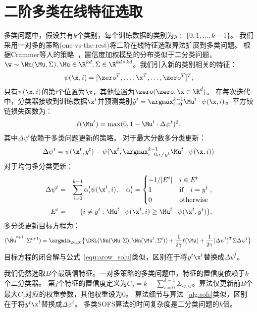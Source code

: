 \section{二阶多类在线特征选取}\label{ssec:smofs}
多类问题中，假设共有$k$个类别，每个训练数据的类别为$y\in\{0,1,\ldots,k-1\}$。
我们采用一对多的策略(one-vs-the-rest)将二阶在线特征选取算法扩展到多类问题。
根据Crammer等人的策略~\cite{crammer2009multi}，置信度加权模型的分布类似于二分类问题，
$\w\sim\Nn(\Mu,\Sigma), \Mu \in \R^{kd}, \Sigma\in\R^{kd\times
kd}$。我们引入新的类别相关的特征：
\begin{eqnarray*}
    \psi(\x,i) = [\zero^T,\ldots,\x^T,\ldots,\zero^T]^T,
\end{eqnarray*}
只有$\psi(\x,i)$的第i个位置为$\x$，其他位置为$\zero(\zero, \x \in \R^d)$。
在每次迭代中，分类器接收到训练数据$\x^t$并预测类别$\hat{y}^t =
\argmax_{i=0}^{k-1}{\Mu^t \cdot \psi(\x,i)}$。平方铰链损失函数为：
\begin{eqnarray}
    \ell(\Mu^t) = \max(0,1 - \Mu^t \cdot \Delta\psi^t)^2,
\end{eqnarray}
其中$\Delta\psi^t$依赖于多类问题更新的策略。
对于最大分数多分类更新：
\begin{eqnarray}
    \Delta\psi^t = \psi(\x^t,y^t) - \psi(\x^t,\argmax_{i=0,i \neq y^t}^{k-1}{\Mu^t
    \cdot \psi(\x,i))}
\end{eqnarray}
对于均匀多分类更新：
\begin{eqnarray}
    \Delta\psi^t &=& \sum_{i=0}^{k-1}\alpha^{t}_{i}\psi(\x^t,i), \quad
    \alpha^{t}_{i} =
    \begin{cases}
        -1 / |E^t|& i\in E^t\\
        1 & \text{if}\quad i = y^t\\
        0 & \text{otherwise}
    \end{cases}, \\
    E^t &=& \{i \neq y^t: \Mu^t \cdot \psi(\x^t, i)\geq \Mu^t \cdot \psi(\x^t,y^t)\},
\end{eqnarray}
多分类更新目标方程为：
\small
\begin{eqnarray}
    (\hat{\Mu}^{t+1},\Sigma^{t+1}) =
    \argmin_{\Mu,\Sigma}\big\{\DKL(\Nn(\Mu,\Sigma),
    \Nn(\Mu^t,\Sigma^t)) + \frac{1}{2\gamma}\ell(\Mu) +
    \frac{1}{2\gamma}(\Delta\psi^t)^T\Sigma\Delta\psi^t\big\}.
    \label{equ:multi_arow_obj}
\end{eqnarray}
\normalsize
目标方程的闭合解与公式~\eqref{equ:arow_solu}类似，区别在于将$y^t\x^t$替换成$\Delta\psi^t$。

我们仍然选取$B$个最确信特征。一对多策略的多类问题中，特征的置信度依赖于$k$个二分类器。
第$j$个特征的置信度定义为$C_j = k -
\sum_{i=0}^{k-1}\Sigma_{ij,ij}$。算法仅更新前$B$个最大$C_j$对应的权重参数，其他权重设为$0$。
算法细节与算法~\ref{alg:sofs}类似，区别在于将$y^t\x^t$替换成$\Delta\psi^t$。
多类SOFS算法的时间复杂度是二分类问题的$k$倍。

